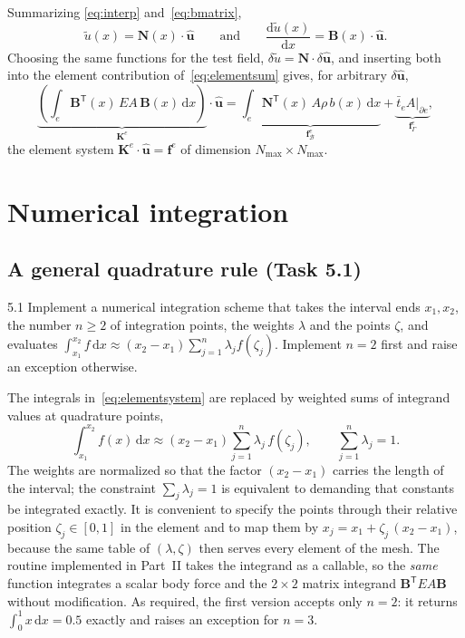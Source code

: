\documentclass[11pt,a4paper]{article}
\numberwithin{equation}{section}
\theoremstyle{remark}
\newcommand{\bN}{\bm{N}}
\newcommand{\bB}{\bm{B}}
\newcommand{\bK}{\bm{K}}
\newcommand{\bff}{\bm{f}}
\newcommand{\buh}{\hat{\bm{u}}}
\begin{document}
Summarizing
\eqref{eq:interp} and~\eqref{eq:bmatrix},
\begin{equation}\label{eq:NB}
  \boxed{\;\tilde{u}(x) = \bN(x)\cdot\buh
  \qquad\text{and}\qquad
  \frac{\mathrm{d}\tilde u(x)}{\mathrm{d}x} = \bB(x)\cdot\buh .\;}
\end{equation}
Choosing the same functions for the test field, $\delta\tilde u = \bN\cdot\delta\buh$, and
inserting both into the element contribution of~\eqref{eq:elementsum} gives, for arbitrary
$\delta\buh$,
\begin{equation}\label{eq:elementsystem}
  \underbrace{\left(\int_e \bB^{\mathsf{T}}(x)\,E A\,\bB(x)\,\mathrm{d}x\right)}_{\bK^e}\cdot\buh
  = \underbrace{\int_e \bN^{\mathsf{T}}(x)\,A\rho\,b(x)\,\mathrm{d}x}_{\bff^e_{\mathcal{B}}}
  + \underbrace{\bar{t}_e A\big|_{\partial e}}_{\bff^e_{\Gamma}},
\end{equation}
the element system $\bK^e\cdot\buh = \bff^e$ of dimension $N_{\max}\times N_{\max}$.

\section{Numerical integration}\label{sec:quadrature}

\subsection{A general quadrature rule (Task 5.1)}\label{sec:quadrule}

\begin{task}{5.1}
  Implement a numerical integration scheme that takes the interval ends $x_1, x_2$, the
  number $n \ge 2$ of integration points, the weights $\lambda$ and the points $\zeta$,
  and evaluates
  $\int_{x_1}^{x_2} f \,\mathrm{d}x \approx (x_2-x_1)\sum_{j=1}^n \lambda_j f(\zeta_j)$.
  Implement $n=2$ first and raise an exception otherwise.
\end{task}

The integrals in~\eqref{eq:elementsystem} are replaced by weighted sums of integrand
values at quadrature points,
\begin{equation}\label{eq:quadrature}
  \int_{x_1}^{x_2} f(x)\,\mathrm{d}x \approx (x_2 - x_1)\sum_{j=1}^{n}\lambda_j\,f(\zeta_j),
  \qquad \sum_{j=1}^n \lambda_j = 1 .
\end{equation}
The weights are normalized so that the factor $(x_2-x_1)$ carries the length of the
interval; the constraint $\sum_j\lambda_j = 1$ is equivalent to demanding that constants be
integrated exactly. It is convenient to specify the points through their relative position
$\zeta_j \in [0,1]$ in the element and to map them by
$x_j = x_1 + \zeta_j\,(x_2 - x_1)$, because the same table of $(\lambda,\zeta)$ then serves
every element of the mesh. The routine implemented in Part~II takes the integrand as a
callable, so the \emph{same} function integrates a scalar body force and the
$2\times2$ matrix integrand $\bB^{\mathsf{T}}EA\bB$ without modification. As required, the first
version accepts only $n = 2$: it returns $\int_0^1 x\,\mathrm{d}x = 0.5$ exactly and raises an
exception for $n = 3$.
\end{document}
